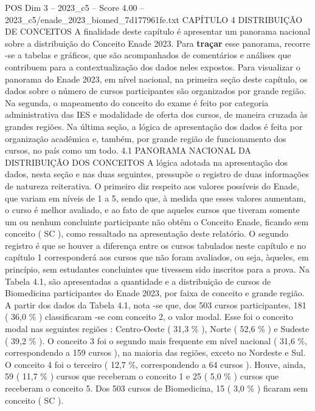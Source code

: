 \begin{textsample}{POS Dim 3 – 2023\_c5 – Score 4.00 – 2023\_c5/enade\_2023\_biomed\_7d177961fe.txt}  \label{ex:f3_pos_054}
CAPÍTULO 4 DISTRIBUIÇÃO DE CONCEITOS A finalidade deste capítulo é apresentar um panorama nacional sobre a distribuição do Conceito Enade 2023.
Para \textbf{traçar} esse panorama, recorre -se a tabelas e gráficos, que são acompanhados de comentários e análises que contribuem para a contextualização dos dados neles expostos.
Para visualizar o panorama do Enade 2023, em nível nacional, na primeira seção deste capítulo, os dados sobre o número de cursos participantes são organizados por grande região.
Na segunda, o mapeamento do conceito do exame é feito por categoria administrativa das IES e modalidade de oferta dos cursos, de maneira cruzada às grandes regiões.
Na última seção, a lógica de apresentação dos dados é feita por organização acadêmica e, também, por grande região de funcionamento dos cursos, no país como um todo. 4.1 PANORAMA NACIONAL DA DISTRIBUIÇÃO DOS CONCEITOS A lógica adotada na apresentação dos dados, nesta seção e nas duas seguintes, pressupõe o registro de duas informações de natureza reiterativa.
O primeiro diz respeito aos valores possíveis do Enade, que variam em níveis de 1 a 5, sendo que, à medida que esses valores aumentam, o curso é melhor avaliado, e ao fato de que aqueles cursos que tiveram somente um ou nenhum concluinte participante não obtêm o Conceito Enade, ficando sem conceito ( SC ), como ressaltado na apresentação deste relatório.
O segundo registro é que se houver a diferença entre os cursos tabulados neste capítulo e no capítulo 1 corresponderá aos cursos que não foram avaliados, ou seja, àqueles, em princípio, sem estudantes concluintes que tivessem sido inscritos para a prova.
Na Tabela 4.1, são apresentadas a quantidade e a distribuição de cursos de Biomedicina participantes do Enade 2023, por faixa de conceito e grande região.
A partir dos dados da Tabela 4.1, nota -se que, dos 503 cursos participantes, 181 ( 36,0 \% ) classificaram -se com conceito 2, o valor modal.
Esse foi o conceito modal nas seguintes regiões : Centro-Oeste ( 31,3 \% ), Norte ( 52,6 \% ) e Sudeste ( 39,2 \% ).
O conceito 3 foi o segundo mais frequente em nível nacional ( 31,6 \%, correspondendo a 159 cursos ), na maioria das regiões, exceto no Nordeste e Sul.
O conceito 4 foi o terceiro ( 12,7 \%, correspondendo a 64 cursos ).
Houve, ainda, 59 ( 11,7 \% ) cursos que receberam o conceito 1 e 25 ( 5,0 \% ) cursos que receberam o conceito 5.
Dos 503 cursos de Biomedicina, 15 ( 3,0 \% ) ficaram sem conceito ( SC ).

\end{textsample}
